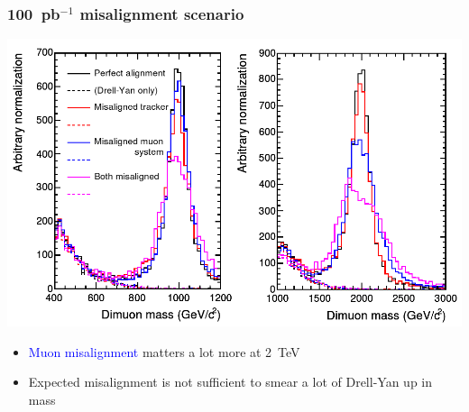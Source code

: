 \documentclass[compress]{beamer}
\begin{document}
\begin{frame}
\frametitle{100~pb$^{-1}$ misalignment scenario}

\includegraphics[width=\linewidth]{misaligned_spectra.png}

\begin{itemize}
\item \textcolor{blue}{Muon misalignment} matters a lot more at 2~TeV
\item Expected misalignment is not sufficient to smear a lot of Drell-Yan up in mass
\end{itemize}
\end{frame}
\end{document}
